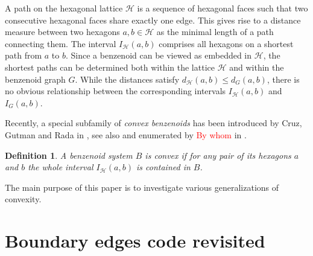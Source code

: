 \documentclass[a4paper,10pt]{article}
\newcounter{theorem}
\newtheorem{definition}{Definition}[section]
\newcommand\TODO[1]{\textcolor{red}{#1}}
\begin{document}
A path on the hexagonal lattice $\mathcal{H}$ is a sequence of hexagonal
faces such that two consecutive hexagonal faces share exactly one
edge. This gives rise to a distance measure between two hexagons
$a,b\in\mathcal{H}$ as the minimal length of a path connecting them. The
interval $I_\mathcal{H}(a,b)$ comprises all hexagons on a shortest path
from $a$ to $b$. Since a benzenoid can be viewed as embedded in
$\mathcal{H}$, the shortest paths can be determined both within the lattice
$\mathcal{H}$ and within the benzenoid graph $G$. While the distances
satisfy $d_{\mathcal{H}}(a,b)\le d_G(a,b)$, there is no obvious
relationship between the corresponding intervals $I_\mathcal{H}(a,b)$ and
$I_G(a,b)$.

Recently, a special subfamily of \emph{convex benzenoids} has been
introduced by Cruz, Gutman and Rada in \cite{CruGutRad12}, see also
\cite{Rada:04} and enumerated by \TODO{By whom} in \cite{basic2017}.
\begin{definition}
\label{def:original}
A benzenoid system $B$ is \emph{convex} if for any pair of its hexagons $a$
and $b$ the whole interval $I_\mathcal{H}(a,b)$ is contained in $B$.
\end{definition}
The main purpose of this paper is to investigate various generalizations of
convexity.

\section{Boundary edges code revisited}
\end{document}
